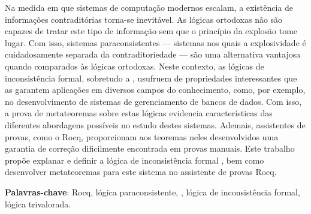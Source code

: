 
\setlength{\absparsep}{18pt} %
\begin{resumo}
    Na medida em que sistemas de computação modernos escalam, a existência de informações contraditórias torna-se inevitável. As lógicas ortodoxas não são capazes de tratar este tipo de informação sem que o princípio da explosão tome lugar. Com isso, sistemas paraconsistentes {---} sistemas nos quais a explosividade é cuidadosamente separada da contraditoriedade {---} são uma alternativa vantajosa quando comparados às lógicas ortodoxas. Neste contexto, as lógicas de inconsistência formal, sobretudo a \lfium{}, usufruem de propriedades interessantes que as garantem aplicações em diversos campos do conhecimento, como, por exemplo, no desenvolvimento de sistemas de gerenciamento de bancos de dados. Com isso, a prova de metateoremas sobre estas lógicas evidencia características das diferentes abordagens possíveis no estudo destes sistemas. Ademais, assistentes de provas, como o Rocq, proporcionam aos teoremas neles desenvolvidos uma garantia de correção dificilmente encontrada em provas manuais. Este trabalho propõe explanar e definir a lógica de inconsistência formal \lfium{}, bem como desenvolver metateoremas para este sistema no assistente de provas Rocq.

 \textbf{Palavras-chave}: Rocq, lógica paraconsistente, \lfium{}, lógica de inconsistência formal, lógica trivalorada.
\end{resumo}
